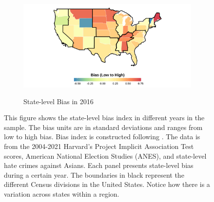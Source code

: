\begin{center}
\begin{figure}[H]
\begin{subfigure}{.45\textwidth}
\label{fig:skiniat-map-2008}
\end{subfigure}
\hfill%
\begin{subfigure}{.45\textwidth}
\caption{State-level Bias in 2016}
\centering
\includegraphics[width=0.9\linewidth]{figure/2016skinmap.png} 
\label{fig:skiniat-map-2010}
\end{subfigure}

\caption*{\footnotesize{This figure shows the state-level bias index in different years in the sample. The bias units are in standard deviations and ranges from low to high bias. Bias index is constructed following \textcite{lubotskyInterpretationRegressionsMultiple2006}. The data is from the 2004-2021 Harvard's Project Implicit Association Test scores, American National Election Studies (ANES), and state-level hate crimes against Asians. Each panel presents state-level bias during a certain year. The boundaries in black represent the different Census divisions in the United States. Notice how there is a variation across states within a region.}}
\end{figure}
\end{center}

\newpage
\pagebreak

